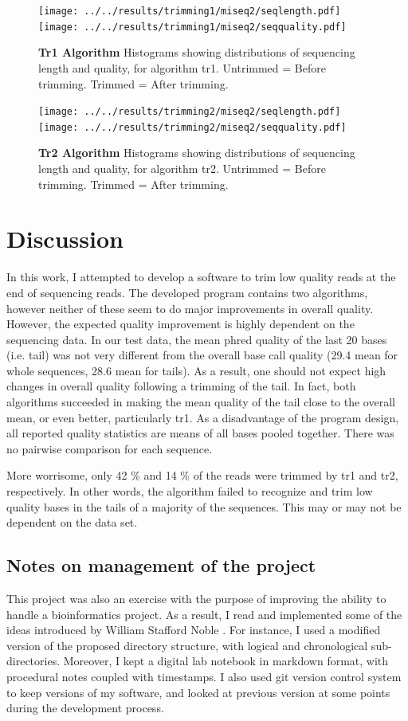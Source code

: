 \documentclass[10pt,letterpaper]{article}
\begin{document}
\begin{figure}[!h]
\caption{{\bf Tr1 Algorithm}
Histograms showing distributions of sequencing length and quality, for algorithm tr1. Untrimmed = Before trimming. Trimmed = After trimming.}
\texttt{[image: ../../results/trimming1/miseq2/seqlength.pdf]}
\texttt{[image: ../../results/trimming1/miseq2/seqquality.pdf]}
\label{fig1}
\end{figure}

\begin{figure}[!h]
\caption{{\bf Tr2 Algorithm}
Histograms showing distributions of sequencing length and quality, for algorithm tr2. Untrimmed = Before trimming. Trimmed = After trimming.}
\texttt{[image: ../../results/trimming2/miseq2/seqlength.pdf]}
\texttt{[image: ../../results/trimming2/miseq2/seqquality.pdf]}
\label{fig2}
\end{figure}


\section*{Discussion}
In this work, I attempted to develop a software to trim low quality reads at the end of sequencing reads. The developed program contains two algorithms, however neither of these seem to do major improvements in overall quality. However, the expected quality improvement is highly dependent on the sequencing data. In our test data, the mean phred quality of the last 20 bases (i.e. tail) was not very different from the overall base call quality (29.4 mean for whole sequences, 28.6 mean for tails). As a result, one should not expect high changes in overall quality following a trimming of the tail. In fact, both algorithms succeeded in making the mean quality of the tail close to the overall mean, or even better, particularly tr1. As a disadvantage of the program design, all reported quality statistics are means of all bases pooled together. There was no pairwise comparison for each sequence. 

More worrisome, only 42 \% and 14 \% of the reads were trimmed by tr1 and tr2, respectively. In other words, the algorithm failed to recognize and trim low quality bases in the tails of a majority of the sequences. This may or may not be dependent on the data set.

\subsection*{Notes on management of the project}
This project was also an exercise with the purpose of improving the ability to handle a bioinformatics project. As a result, I read and implemented some of the ideas introduced by William Stafford Noble \cite{bib2}. For instance, I used a modified version of the proposed directory structure, with logical and chronological sub-directories. Moreover, I kept a digital lab notebook in markdown format, with procedural notes coupled with timestamps. I also used git version control system to keep versions of my software, and looked at previous version at some points during the development process.
\end{document}
